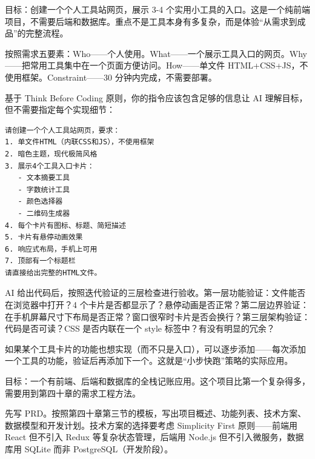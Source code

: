 



目标：创建一个个人工具站网页，展示 3-4 个实用小工具的入口。这是一个纯前端项目，不需要后端和数据库。重点不是工具本身有多复杂，而是体验“从需求到成品”的完整流程。

按照需求五要素：Who——个人使用。What——一个展示工具入口的网页。Why——把常用工具集中在一个页面方便访问。How——单文件 HTML+CSS+JS，不使用框架。Constraint——30 分钟内完成，不需要部署。


基于 Think Before Coding 原则，你的指令应该包含足够的信息让 AI 理解目标，但不需要指定每个实现细节：

\begin{lstlisting}
请创建一个个人工具站网页，要求：
1. 单文件HTML（内联CSS和JS），不使用框架
2. 暗色主题，现代极简风格
3. 展示4个工具入口卡片：
   - 文本摘要工具
   - 字数统计工具
   - 颜色选择器
   - 二维码生成器
4. 每个卡片有图标、标题、简短描述
5. 卡片有悬停动画效果
6. 响应式布局，手机上可用
7. 顶部有一个标题栏
请直接给出完整的HTML文件。
\end{lstlisting}


AI 给出代码后，按照迭代验证的三层检查进行验收。第一层功能验证：文件能否在浏览器中打开？4 个卡片是否都显示了？悬停动画是否正常？第二层边界验证：在手机屏幕尺寸下布局是否正常？窗口很窄时卡片是否会换行？第三层架构验证：代码是否可读？CSS 是否内联在一个 style 标签中？有没有明显的冗余？

如果某个工具卡片的功能也想实现（而不只是入口），可以逐步添加——每次添加一个工具的功能，验证后再添加下一个。这就是“小步快跑”策略的实际应用。



目标：一个有前端、后端和数据库的全栈记账应用。这个项目比第一个复杂得多，需要用到第四十章的需求工程方法。

先写 PRD。按照第四十章第三节的模板，写出项目概述、功能列表、技术方案、数据模型和开发计划。技术方案的选择要考虑 Simplicity First 原则——前端用 React 但不引入 Redux 等复杂状态管理，后端用 Node.js 但不引入微服务，数据库用 SQLite 而非 PostgreSQL（开发阶段）。

